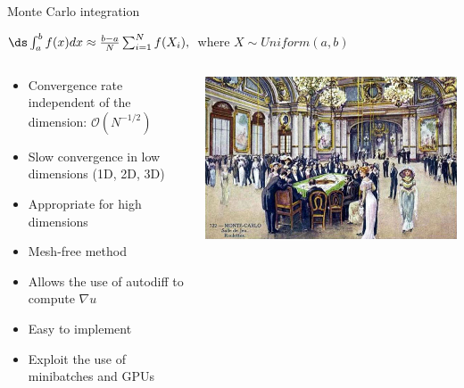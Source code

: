 \begin{frame}{Monte Carlo integration}
\begin{center}
$
\ds \int_a^b f(x) dx \approx \frac{b-a}{N} \sum_{i=1}^N f(X_i), \;
$
where $X \sim Uniform(a,b)$
\end{center}

\begin{columns}
\begin{column}{0.8\textwidth}
\begin{itemize}
\item[\tickYes] Convergence rate independent of the dimension: $\mathcal{O}(N^{-1/2})$
\item[\tickNo] Slow convergence in low dimensions (1D, 2D, 3D)
\item[\tickYes] Appropriate for high dimensions
\item[\tickYes] Mesh-free method
\item[\tickYes] Allows the use of autodiff to compute $\nabla u$
\item[\tickYes] Easy to implement
\item[\tickYes] Exploit the use of minibatches and GPUs
\end{itemize}
\end{column}
%
\begin{column}{0.2\textwidth}
\vspace{-2.2cm}
\hspace{-3cm}
\includegraphics[scale=1.2]{frames/Javi/img/casino.jpg}

    \end{column}
\end{columns}
\end{frame}

